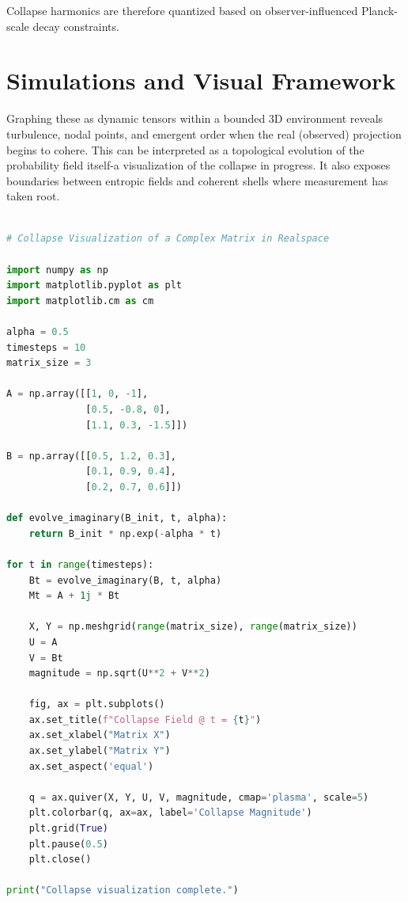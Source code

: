 Collapse harmonics are therefore quantized based on observer-influenced Planck-scale decay constraints. \cite{imaginary_meta} 

\section{Simulations and Visual Framework}
Graphing these as dynamic tensors within a bounded 3D environment reveals turbulence, nodal points, and emergent order when the real (observed) projection begins to cohere. This can be interpreted as a topological evolution of the probability field itself-a visualization of the collapse in progress. \cite{imaginary_meta} It also exposes boundaries between entropic fields and coherent shells where measurement has taken root. \cite{imaginary_meta} 

\begin{lstlisting}[language=Python, caption={Collapse Visualization of a Complex Matrix in Realspace}, label={lst:collapse}]

# Collapse Visualization of a Complex Matrix in Realspace

import numpy as np
import matplotlib.pyplot as plt
import matplotlib.cm as cm

alpha = 0.5
timesteps = 10
matrix_size = 3

A = np.array([[1, 0, -1],
              [0.5, -0.8, 0],
              [1.1, 0.3, -1.5]])

B = np.array([[0.5, 1.2, 0.3],
              [0.1, 0.9, 0.4],
              [0.2, 0.7, 0.6]])

def evolve_imaginary(B_init, t, alpha):
    return B_init * np.exp(-alpha * t)

for t in range(timesteps):
    Bt = evolve_imaginary(B, t, alpha)
    Mt = A + 1j * Bt

    X, Y = np.meshgrid(range(matrix_size), range(matrix_size))
    U = A
    V = Bt
    magnitude = np.sqrt(U**2 + V**2)

    fig, ax = plt.subplots()
    ax.set_title(f"Collapse Field @ t = {t}")
    ax.set_xlabel("Matrix X")
    ax.set_ylabel("Matrix Y")
    ax.set_aspect('equal')

    q = ax.quiver(X, Y, U, V, magnitude, cmap='plasma', scale=5)
    plt.colorbar(q, ax=ax, label='Collapse Magnitude')
    plt.grid(True)
    plt.pause(0.5)
    plt.close()

print("Collapse visualization complete.")
\end{lstlisting}

